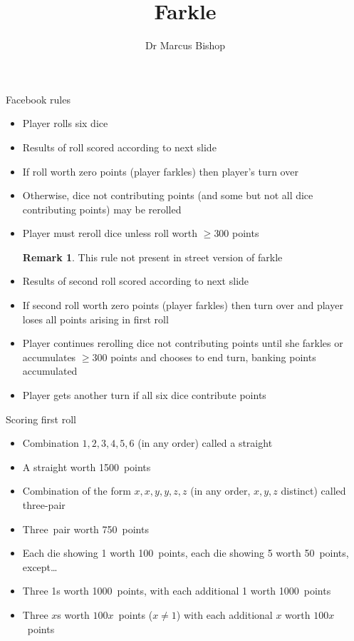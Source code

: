 \documentclass[handout]{beamer}
\title[Farkle]{Farkle}
\author{Dr Marcus Bishop}
\theoremstyle{definition}
\newtheorem{remark}{Remark}
\begin{document}
\begin{frame}\titlepage\end{frame}
\LogoOff

\begin{frame}{Facebook rules}
\begin{itemize}
\item Player rolls six dice
\item Results of roll scored according to next slide
\item If roll worth zero points (player \alert{farkles})
then player's turn over
\item Otherwise, dice not contributing points 
(and some but not all dice contributing points) \alert{may}
be rerolled
\item Player \alert{must} reroll dice
unless roll worth $\ge 300$ points
\begin{remark}
This rule not present in street version of farkle
\end{remark}
\item Results of second roll scored according to next slide
\item If second roll worth zero points
(player \alert{farkles}) then turn over and
player loses all points arising in first roll
\item Player continues rerolling dice not contributing
points until she farkles or accumulates $\ge 300$ points and
chooses to end turn, banking points accumulated
\item Player gets another turn if all six
dice contribute points
\end{itemize}
\end{frame}

\begin{frame}{Scoring first roll}
\begin{itemize}
\item Combination $1,2,3,4,5,6$
(in any order) called a \alert{straight}
\item A straight worth 1500~points
\item Combination of the form $x,x,y,y,z,z$
(in any order, $x,y,z$ distinct) called \alert{three-pair}
\item Three~pair worth 750~points
\item Each die showing 1 worth 100~points, each die showing 5 worth 50~points,
except\dots
\item Three 1s worth 1000~points, with each additional
1 worth 1000~points
\item Three $x$s worth $100x$~points ($x\ne 1$)
with each additional $x$ worth $100x$~points
\end{itemize}
\end{frame}
\end{document}
